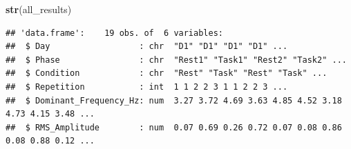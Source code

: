 \documentclass[
]{article}
\newenvironment{Shaded}{\begin{snugshade}}{\end{snugshade}}
\newcommand{\FunctionTok}[1]{\textcolor[rgb]{0.13,0.29,0.53}{\textbf{#1}}}
\newcommand{\NormalTok}[1]{#1}
\begin{document}
\begin{Shaded}
\begin{Highlighting}[]
\FunctionTok{str}\NormalTok{(all\_results)}
\end{Highlighting}
\end{Shaded}

\begin{verbatim}
## 'data.frame':    19 obs. of  6 variables:
##  $ Day                  : chr  "D1" "D1" "D1" "D1" ...
##  $ Phase                : chr  "Rest1" "Task1" "Rest2" "Task2" ...
##  $ Condition            : chr  "Rest" "Task" "Rest" "Task" ...
##  $ Repetition           : int  1 1 2 2 3 1 1 2 2 3 ...
##  $ Dominant_Frequency_Hz: num  3.27 3.72 4.69 3.63 4.85 4.52 3.18 4.73 4.15 3.48 ...
##  $ RMS_Amplitude        : num  0.07 0.69 0.26 0.72 0.07 0.08 0.86 0.08 0.88 0.12 ...
\end{verbatim}
\end{document}
